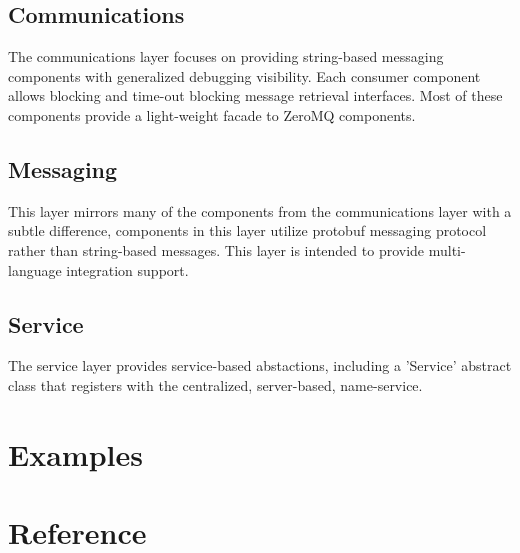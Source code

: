 \documentclass[fontsize=12pt]{book}
\newcommand{\insertPython}[1]{ 
\begin{tcolorbox}[title=#1,coltitle=lightgray,width=6in]

\end{tcolorbox}
}
\begin{document}
\section{Communications}
The communications layer focuses on providing string-based messaging components with generalized debugging visibility.  Each consumer component allows blocking and time-out blocking message retrieval interfaces.  Most of these components provide a light-weight facade to ZeroMQ components.

\section{Messaging}
This layer mirrors many of the components from the communications layer with a subtle difference, components in this layer utilize protobuf messaging protocol rather than string-based messages.  This layer is intended to provide multi-language integration support.

\section{Service}
The service layer provides service-based abstactions, including a 'Service' abstract class that registers with the centralized, server-based, name-service.

\chapter{Examples}
\insertPython{simplePubSub.py}

\chapter{Reference}

\end{document}
